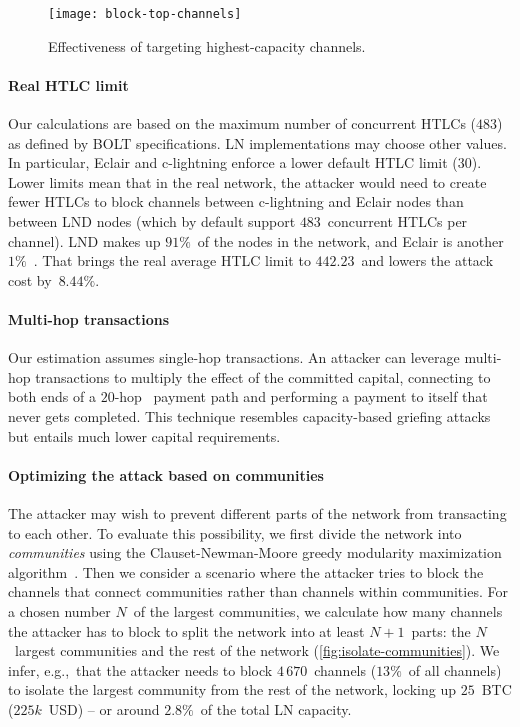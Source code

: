 \begin{figure}[tb]
	\centering
	\texttt{[image: block-top-channels]}
	\caption{Effectiveness of targeting highest-capacity channels.}
	\label{fig:block-top-channels}
\end{figure}

\paragraph{Real HTLC limit}
Our calculations are based on the maximum number of concurrent HTLCs ($483$) as defined by BOLT specifications.
LN implementations may choose other values.
In particular, Eclair and c-lightning enforce a lower default HTLC limit ($30$).
Lower limits mean that in the real network, the attacker would need to create fewer HTLCs to block channels between c-lightning and Eclair nodes than between LND nodes (which by default support $483$~concurrent HTLCs per channel).
LND makes up $91\%$~of the nodes in the network, and Eclair is another $1\%$~\cite{Mizrahi2020}.
That brings the real average HTLC limit to $442.23$~and lowers the attack cost by~$8.44\%$.

\paragraph{Multi-hop transactions}
Our estimation assumes single-hop transactions.
An attacker can leverage multi-hop transactions to multiply the effect of the committed capital, connecting to both ends of a $20$-hop~\cite{Bolt4OnionRouting} payment path and performing a payment to itself that never gets completed.
This technique resembles capacity-based griefing attacks~\cite{HerreraJoancomarti2019} but entails much lower capital requirements.

\paragraph{Optimizing the attack based on communities}
The attacker may wish to prevent different parts of the network from transacting to each other.
To evaluate this possibility, we first divide the network into \textit{communities} using the Clauset-Newman-Moore greedy modularity maximization algorithm~\cite{Clauset2004}.
Then we consider a scenario where the attacker tries to block the channels that connect communities rather than channels within communities.
For a chosen number $N$~of the largest communities, we calculate how many channels the attacker has to block to split the network into at least $N+1$~parts: the $N$~largest communities and the rest of the network (\cref{fig:isolate-communities}).
We infer, e.g.,~that the attacker needs to block $4\,670$~channels ($13\%$~of all channels) to isolate the largest community from the rest of the network, locking up $25$~BTC ($225k$~USD) -- or around $2.8\%$~of the total LN capacity.

